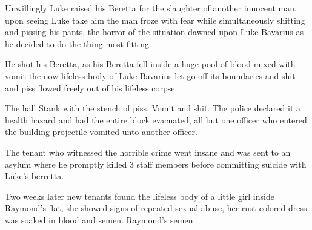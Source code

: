 Unwillingly Luke raised his Beretta for the slaughter of
another innocent man, upon seeing Luke take aim the man froze with
fear while simultaneously shitting and pissing his pants, the
horror of the situation dawned upon Luke Bavarius as he decided to
do the thing most fitting.



He shot his Beretta, as his Beretta fell inside a huge pool of
blood mixed with vomit the now lifeless body of Luke Bavarius let
go off its boundaries and shit and piss flowed freely out of his
lifeless corpse.



The hall Stank with the stench of piss, Vomit and shit. The police
declared it a health hazard and had the entire block evacuated, all
but one officer who entered the building projectile vomited unto
another officer.



The tenant who witnessed the horrible crime went insane and was
sent to an asylum where he promptly killed 3 staff members before
committing suicide with Luke's berretta.



Two weeks later new tenants found the lifeless body of a little
girl inside Raymond's flat, she showed signs of repeated
sexual abuse, her rust colored dress was soaked in blood and semen.
Raymond's semen.


 



